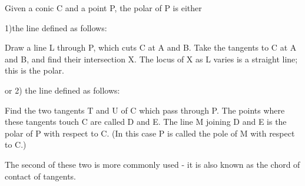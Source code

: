 Given a conic C and a point P, the polar of P is either
\par
1)the line defined as follows:
\par
Draw a line L through P, which cuts C at A and B. Take the tangents to C at 
A and B, and find their intersection X. The locus of X as L varies is a straight
line; this is the polar.
\par
or 2) the line defined as follows:
\par
Find the two tangents T and U of C which pass through P. The points where these
tangents touch C are called D and E. The line M joining D and E is the polar of
P with respect to C. (In this case P is called the pole of M with respect to C.)
\par
The second of these two is more commonly used - it is also known as the chord
of contact of tangents.